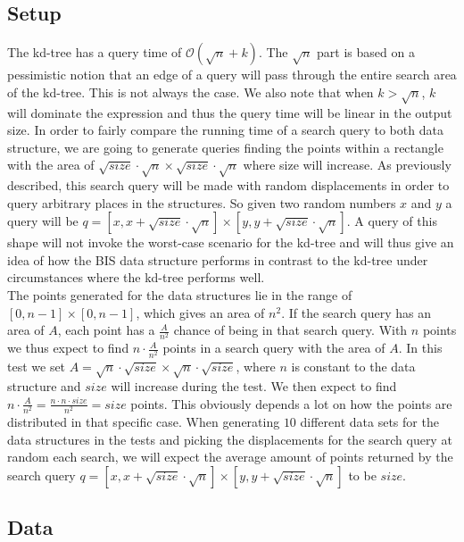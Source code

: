 \subsection{Setup}
The kd-tree has a query time of $\mathcal{O}(\sqrt{n}+k)$. The $\sqrt{n}$ part is based on a pessimistic notion that an edge of a query will pass through the entire search area of the kd-tree. This is not always the case. We also note that when $k > \sqrt{n}$, $k$ will dominate the expression and thus the query time will be linear in the output size. In order to fairly compare the running time of a search query to both data structure, we are going to generate queries finding the points within a rectangle with the area of $\sqrt{size}\cdot\sqrt{n} \times \sqrt{size}\cdot\sqrt{n}$ where size will increase. As previously described, this search query will be made with random displacements in order to query arbitrary places in the structures. So given two random numbers $x$ and $y$ a query will be $q = [x, x+\sqrt{size}\cdot\sqrt{n}] \times [y, y+\sqrt{size}\cdot\sqrt{n}]$. A query of this shape will not invoke the worst-case scenario for the kd-tree and will thus give an idea of how the BIS data structure performs in contrast to the kd-tree under circumstances where the kd-tree performs well. \\

The points generated for the data structures lie in the range of $[0,n-1] \times [0,n-1]$, which gives an area of $n^2$. If the search query has an area of $A$, each point has a $\frac{A}{n^2}$ chance of being in that search query. With $n$ points we thus expect to find $n\cdot \frac{A}{n^2}$ points in a search query with the area of $A$. In this test we set $A = \sqrt{n}\cdot\sqrt{size}\times\sqrt{n}\cdot\sqrt{size}$, where $n$ is constant to the data structure and $size$ will increase during the test. We then expect to find $n\cdot\frac{A}{n^2} = \frac{n\cdot n \cdot size}{n^2} = size$ points. This obviously depends a lot on how the points are distributed in that specific case. When generating $10$ different data sets for the data structures in the tests and picking the displacements for the search query at random each search, we will expect the average amount of points returned by the search query $q = [x, x+\sqrt{size}\cdot\sqrt{n}] \times [y, y+\sqrt{size}\cdot\sqrt{n}]$ to be $size$.

\subsection{Data}

